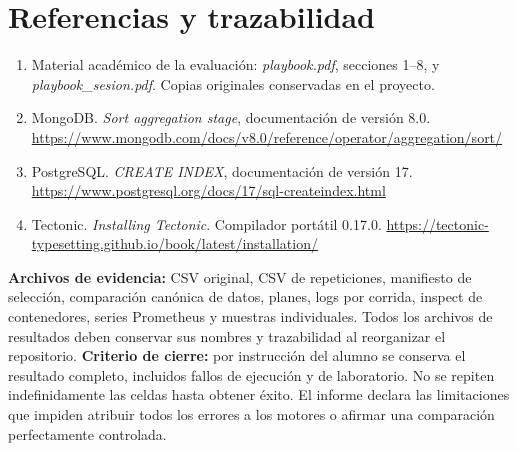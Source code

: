 \documentclass[11pt,letterpaper]{article}
\begin{document}
\section*{Referencias y trazabilidad}
\begin{enumerate}
\item Material académico de la evaluación: \textit{playbook.pdf}, secciones 1--8, y \textit{playbook\_sesion.pdf}. Copias originales conservadas en el proyecto.
\item MongoDB. \textit{Sort aggregation stage}, documentación de versión 8.0. \url{https://www.mongodb.com/docs/v8.0/reference/operator/aggregation/sort/}
\item PostgreSQL. \textit{CREATE INDEX}, documentación de versión 17. \url{https://www.postgresql.org/docs/17/sql-createindex.html}
\item Tectonic. \textit{Installing Tectonic}. Compilador portátil 0.17.0. \url{https://tectonic-typesetting.github.io/book/latest/installation/}
\end{enumerate}
\textbf{Archivos de evidencia:} CSV original, CSV de repeticiones, manifiesto de selección, comparación canónica de datos, planes, logs por corrida, inspect de contenedores, series Prometheus y muestras individuales. Todos los archivos de resultados deben conservar sus nombres y trazabilidad al reorganizar el repositorio.
\textbf{Criterio de cierre:} por instrucción del alumno se conserva el resultado completo, incluidos fallos de ejecución y de laboratorio. No se repiten indefinidamente las celdas hasta obtener éxito. El informe declara las limitaciones que impiden atribuir todos los errores a los motores o afirmar una comparación perfectamente controlada.
\clearpage\appendix
\end{document}
